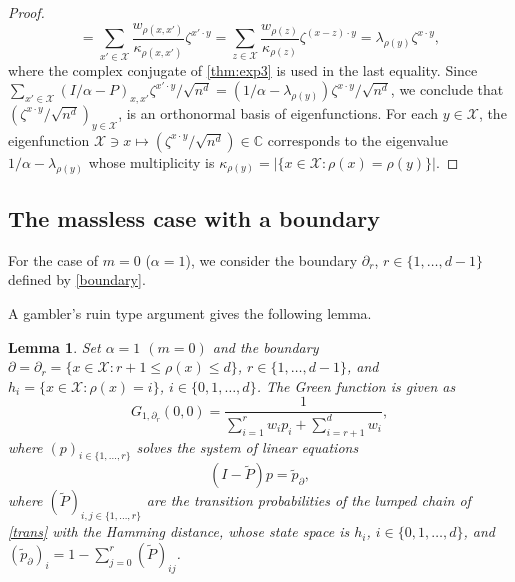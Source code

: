 \documentclass[a4paper,11pt]{article}
\theoremstyle{plain}
\newtheorem{lemma}[theorem]{Lemma}
\theoremstyle{definition}
\begin{document}
\begin{proof}
\[    =\sum_{x'\in \mathcal{X}}\frac{w_{\rho(x,x')}}{\kappa_{\rho(x,x')}}
      \zeta^{x'\cdot y}
    =\sum_{z\in \mathcal{X}}\frac{w_{\rho(z)}}{\kappa_{\rho(z)}}\zeta^{(x-z)\cdot y}
    =\lambda_{\rho(y)}\zeta^{x \cdot y},
  \]
  where the complex conjugate of \eqref{thm:exp3} is
  used in the last equality. Since
  $\sum_{x'\in \mathcal{X}}(I/\alpha-P)_{x,x'}\zeta^{x'\cdot y}/\sqrt{n^d}=(1/\alpha-\lambda_{\rho(y)})\zeta^{x \cdot y}/\sqrt{n^d}$,
  we conclude that
  $(\zeta^{x\cdot y}/\sqrt{n^d})_{y\in\mathcal{X}}$,
  is an orthonormal basis of eigenfunctions. For each
  $y\in\mathcal{X}$, the eigenfunction
  $\mathcal{X}\ni x\mapsto (\zeta^{x\cdot y}/\sqrt{n^d})\in\mathbb{C}$
  corresponds to the eigenvalue
  $1/\alpha-\lambda_{\rho(y)}$ whose multiplicity is
  $\kappa_{\rho(y)}=|\{x\in\mathcal{X}:\rho(x)=\rho(y)\}|$. 
\end{proof}

\subsection{The massless case with a boundary}
\label{sect:rw:m0}

For the case of $m=0$ ($\alpha=1$), we consider
the boundary $\partial_r$, $r \in \{1,\ldots,d-1\}$
defined by \eqref{boundary}.

A gambler's ruin type argument gives the following lemma.

\begin{lemma}\label{lem:var}
  Set $\alpha=1$ $(m=0)$ and the boundary
  $\partial=\partial_r=\{x\in \mathcal{X}:r+1\le \rho(x) \le d\}$,
  $r \in \{1,\ldots,d-1\}$,
  and $h_i=\{x\in\mathcal{X}:\rho(x)=i\}$,
  $i\in\{0,1,\ldots,d\}$. The Green function is given as
  \begin{equation}\label{var_0}
    G_{1,\partial_r}(0,0)=\frac{1}{\sum_{i=1}^r w_ip_i+\sum_{i=r+1}^dw_i},
  \end{equation}
  where $(p)_{i\in\{1,\ldots,r\}}$ solves
  the system of linear equations
  \begin{equation}\label{lem:var:1}
    (I-\tilde{P})p=\tilde{p}_\partial, 
  \end{equation}
  where 
  $(\tilde{P})_{i,j\in\{1,\ldots,r\}}$ are the transition
  probabilities of the lumped chain of \eqref{trans}
  with the Hamming distance, whose state space is
  $h_i$, $i\in\{0,1,\ldots,d\}$, and 
  $(\tilde{p}_\partial)_i=1-\sum_{j=0}^r(\tilde{P})_{ij}$.
\end{lemma}
\end{document}
